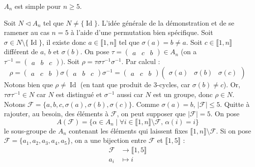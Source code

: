 	\begin{theorem}
		$A_n$ est simple pour $n \geq 5$.
	\end{theorem}

	\begin{demonstration}
		Soit $N \lhd A_n$ tel que $N \neq \{ \operatorname{Id} \}$. L'idée générale de la démonstration et de se ramener au cas $n = 5$ à l'aide d'une permutation bien spécifique.
		\newpar
		Soit $\sigma \in N \setminus \{ \operatorname{Id} \}$, il existe donc $a \in \llbracket 1, n \rrbracket$ tel que $\sigma(a) = b \neq a$. Soit $c \in \llbracket 1, n \rrbracket$ différent de $a$, $b$ et $\sigma(b)$. On pose $\tau = \begin{pmatrix} a & c & b \end{pmatrix} \in A_n$ (on a $\tau^{-1} = \begin{pmatrix} a & b & c \end{pmatrix})$. Soit $\rho = \tau \sigma \tau^{-1} \sigma^{-1}$. Par calcul :
		\[ \rho = \begin{pmatrix} a & c & b \end{pmatrix} \sigma \begin{pmatrix} a & b & c \end{pmatrix} \sigma^{-1} = \begin{pmatrix} a & c & b \end{pmatrix} \begin{pmatrix} \sigma(a) & \sigma(b) & \sigma(c) \end{pmatrix} \]
		Notons bien que $\rho \neq \operatorname{Id}$ (en tant que produit de $3$-cycles, car $\sigma(b) \neq c$). Or, $\tau \sigma \tau^{-1} \in N$ car $N$ est distingué et $\sigma^{-1}$ aussi car $N$ est un groupe, donc $\rho \in N$.
		\newpar
		Notons $\mathcal{F} = \{ a, b, c, \sigma(a), \sigma(b), \sigma(c) \}$. Comme $\sigma(a) = b$, $|\mathcal{F}| \leq 5$. Quitte à rajouter, au besoin, des éléments à $\mathcal{F}$, on peut supposer que $|\mathcal{F}| = 5$. On pose
		\[ A(\mathcal{F}) = \{ \alpha \in A_n \mid \forall i \in \llbracket 1, n \rrbracket \setminus \mathcal{F}, \, \alpha(i) = i \} \]
		le sous-groupe de $A_n$ contenant les éléments qui laissent fixes $\llbracket 1, n \rrbracket \setminus \mathcal{F}$. Si on pose $\mathcal{F} = \{ a_1, a_2, a_3, a_4, a_5 \}$, on a une bijection entre $\mathcal{F}$ et $\llbracket 1, 5 \rrbracket$ :
		\begin{align*}
			\mathcal{F} &\rightarrow \llbracket 1, 5 \rrbracket \\
			a_i &\mapsto i
		\end{align*}

\end{demonstration}
